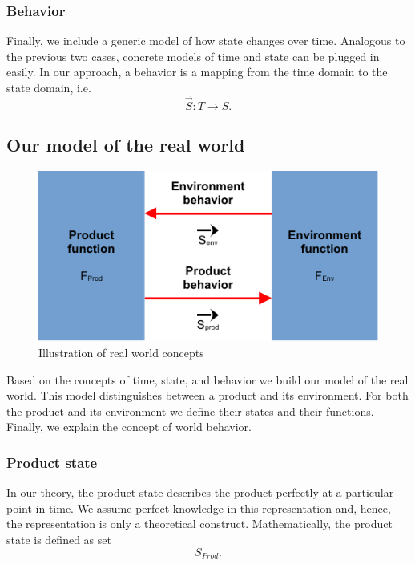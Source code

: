 \documentclass[conference]{IEEEtran}
\begin{document}
    \subsubsection{Behavior}
    Finally, we include a generic model of how state changes over time.
    Analogous to the previous two cases, concrete models of time and state can be plugged in easily.
    In our approach, a behavior is a mapping from the time domain to the state domain, i.e.
    \[
        \overrightarrow{S}: T \rightarrow S.
    \]

    \subsection{Our model of the real world}
    \label{section:theory-world}

    \begin{figure}[htbp]
        \centering
        \includegraphics{./figures/theory-world.pdf}
        \caption{Illustration of real world concepts}
        \label{figure:theory-world}
    \end{figure}

    Based on the concepts of time, state, and behavior we build our model of the real world.
    This model distinguishes between a product and its environment.
    For both the product and its environment we define their states and their functions.
    Finally, we explain the concept of world behavior.

    \subsubsection{Product state}
    In our theory, the product state describes the product perfectly at a particular point in time.
    We assume perfect knowledge in this representation and, hence, the representation is only a theoretical construct.
    Mathematically, the product state is defined as set
    \[
        S_{Prod}.
    \]
\end{document}
